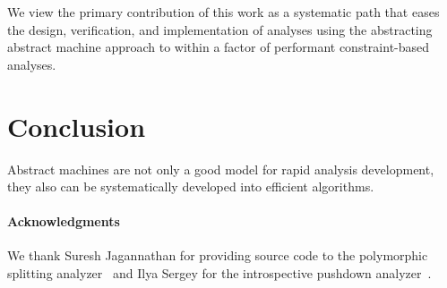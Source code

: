 \documentclass[preprint,onecolumn,9pt]{sigplanconf} %
\begin{document}
We view the primary contribution of this work as a systematic path
that eases the design, verification, and implementation of analyses
using the abstracting abstract machine approach to within a factor of
performant constraint-based analyses.

\section{Conclusion}
\label{sec:conclusion}

Abstract machines are not only a good model for rapid analysis
development, they also can be systematically developed into efficient
algorithms.




\paragraph{Acknowledgments}

We thank Suresh Jagannathan for providing source code to the
polymorphic splitting
analyzer~\cite{dvanhorn:wright-jagannathan-toplas98} and Ilya Sergey
for the introspective pushdown
analyzer~\cite{dvanhorn:Earl2012Introspective}.

\balance



% 
\end{document}
